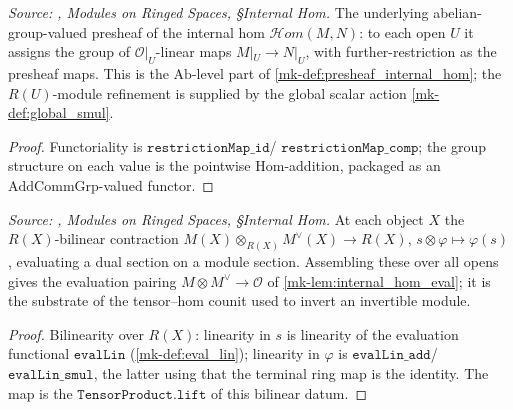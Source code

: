 \begin{definition}\label{mk-def:internal_hom_presheaf}
  \leanok

  \textit{Source: \cite{stacks-project}, Modules on Ringed Spaces, \S Internal Hom.}
  The underlying abelian-group-valued presheaf of the internal hom
  \(\mathcal{H}om(M, N)\): to each open \(U\) it assigns the group of
  \(\mathcal{O}|_U\)-linear maps \(M|_U \to N|_U\), with further-restriction as the
  presheaf maps. This is the \(\mathrm{Ab}\)-level part of
  \ref{mk-def:presheaf_internal_hom}; the \(R(U)\)-module refinement is supplied by the
  global scalar action \ref{mk-def:global_smul}.
\end{definition}
\begin{proof}
  \leanok
 Functoriality is \(\mathtt{restrictionMap\_id}\)/%
  \(\mathtt{restrictionMap\_comp}\); the group structure on each value is the pointwise
  \(\mathrm{Hom}\)-addition, packaged as an \(\mathrm{AddCommGrp}\)-valued functor.
\end{proof}

\begin{definition}\label{mk-def:internal_hom_eval}
  \leanok

  \textit{Source: \cite{stacks-project}, Modules on Ringed Spaces, \S Internal Hom.}
  At each object \(X\) the \(R(X)\)-bilinear contraction \(M(X) \otimes_{R(X)}
  M^\vee(X) \to R(X)\), \(s \otimes \varphi \mapsto \varphi(s)\), evaluating a dual
  section on a module section. Assembling these over all opens gives the evaluation
  pairing \(M \otimes M^\vee \to \mathcal{O}\) of \ref{mk-lem:internal_hom_eval}; it is the
  substrate of the tensor--hom counit used to invert an invertible module.
\end{definition}
\begin{proof}
  \leanok
 Bilinearity over \(R(X)\): linearity in \(s\) is linearity of
  the evaluation functional \(\mathtt{evalLin}\) (\ref{mk-def:eval_lin}); linearity in
  \(\varphi\) is \(\mathtt{evalLin\_add}\)/\(\mathtt{evalLin\_smul}\), the latter using
  that the terminal ring map is the identity. The map is the
  \(\mathtt{TensorProduct.lift}\) of this bilinear datum.
\end{proof}

